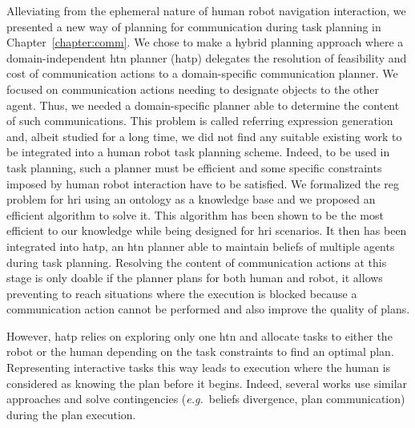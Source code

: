 \documentclass[a4paper,11pt,twoside]{StyleThese}
\begin{document}
Alleviating from the ephemeral nature of human robot navigation interaction, we presented a new way of planning for communication during task planning in Chapter~\ref{chapter:comm}. We chose to make a hybrid planning approach where a domain-independent \acrshort{htn} planner (\acrshort{hatp}) delegates the resolution of feasibility and cost of communication actions to a domain-specific communication planner. We focused on communication actions needing to designate objects to the other agent. Thus, we needed a domain-specific planner able to determine the content of such communications. This problem is called referring expression generation and, albeit studied for a long time, we did not find any suitable existing work to be integrated into a human robot task planning scheme. Indeed, to be used in task planning, such a planner must be efficient and some specific constraints imposed by human robot interaction have to be satisfied. We formalized the \acrshort{reg} problem for \acrshort{hri} using an ontology as a knowledge base and we proposed an efficient algorithm to solve it. This algorithm has been shown to be the most efficient to our knowledge while being designed for \acrshort{hri} scenarios. It then has been integrated into \acrshort{hatp}, an \acrshort{htn} planner able to maintain beliefs of multiple agents during task planning. Resolving the content of communication actions at this stage is only doable if the planner plans for both human and robot, it allows preventing to reach situations where the execution is blocked because a communication action cannot be performed and also improve the quality of plans.

However, \acrshort{hatp} relies on exploring only one \acrfull{htn} and allocate tasks to either the robot or the human depending on the task constraints to find an optimal plan. Representing interactive tasks this way leads to execution where the human is considered as knowing the plan before it begins. Indeed, several works use similar approaches and solve contingencies (\textit{e.g.}~beliefs divergence, plan communication) during the plan execution. 
\end{document}
